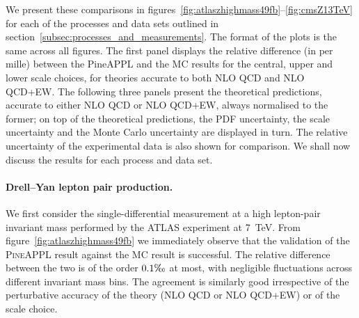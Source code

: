 We present these comparisons in
figures~\ref{fig:atlaszhighmass49fb}--\ref{fig:cmsZ13TeV} for each of the processes
and data sets outlined in section~\ref{subsec:processes_and_measurements}.
The format of the plots is the same across all figures. The first panel
displays the relative difference (in per mille) between the {\sc PineAPPL} and
the MC results for the central, upper and lower scale choices, for
theories accurate to both NLO QCD and NLO QCD+EW. The following three panels
present the theoretical predictions, accurate to either NLO QCD or NLO QCD+EW,
always normalised to the former; on top of the theoretical predictions, the
PDF uncertainty, the scale uncertainty and the Monte Carlo uncertainty are
displayed in turn. The relative uncertainty of the experimental data is
also shown for comparison. We shall now discuss the results for each
process and data set.

\paragraph{Drell--Yan lepton pair production.} 

We first consider the single-differential measurement at a high lepton-pair
invariant mass performed by the ATLAS experiment at \SI{7}{\tera\electronvolt}.
From figure~\ref{fig:atlaszhighmass49fb} we immediately
observe that the validation of the \textsc{PineAPPL} result against the MC
result is successful. The relative difference between the two is of the order
$0.1\tcperthousand$ at most, with negligible fluctuations across different
invariant mass bins. The agreement is similarly good irrespective of the
perturbative accuracy of the theory (NLO QCD or NLO QCD+EW) or of the scale
choice.

